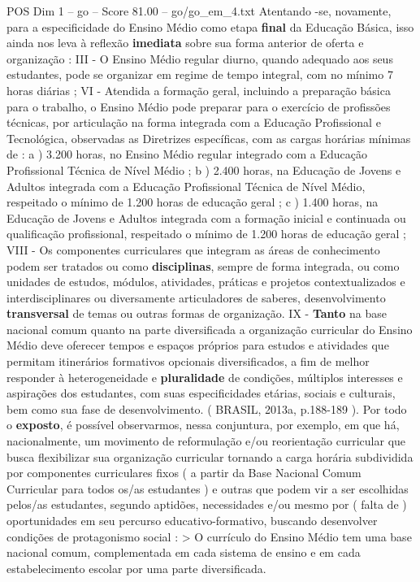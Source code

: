 \begin{textsample}{POS Dim 1 – go – Score 81.00 – go/go\_em\_4.txt}
Atentando -se, novamente, para a especificidade do Ensino Médio como etapa \textbf{final} da Educação Básica, isso ainda nos leva à reflexão \textbf{imediata} sobre sua forma anterior de oferta e organização : III - O Ensino Médio regular diurno, quando adequado aos seus estudantes, pode se organizar em regime de tempo integral, com no mínimo 7 horas diárias ; VI - Atendida a formação geral, incluindo a preparação básica para o trabalho, o Ensino Médio pode preparar para o exercício de profissões técnicas, por articulação na forma integrada com a Educação Profissional e Tecnológica, observadas as Diretrizes específicas, com as cargas horárias mínimas de : a ) 3.200 horas, no Ensino Médio regular integrado com a Educação Profissional Técnica de Nível Médio ; b ) 2.400 horas, na Educação de Jovens e Adultos integrada com a Educação Profissional Técnica de Nível Médio, respeitado o mínimo de 1.200 horas de educação geral ; c ) 1.400 horas, na Educação de Jovens e Adultos integrada com a formação inicial e continuada ou qualificação profissional, respeitado o mínimo de 1.200 horas de educação geral ; VIII - Os componentes curriculares que integram as áreas de conhecimento podem ser tratados ou como \textbf{disciplinas}, sempre de forma integrada, ou como unidades de estudos, módulos, atividades, práticas e projetos contextualizados e interdisciplinares ou diversamente articuladores de saberes, desenvolvimento \textbf{transversal} de temas ou outras formas de organização.
IX - \textbf{Tanto} na base nacional comum quanto na parte diversificada a organização curricular do Ensino Médio deve oferecer tempos e espaços próprios para estudos e atividades que permitam itinerários formativos opcionais diversificados, a fim de melhor responder à heterogeneidade e \textbf{pluralidade} de condições, múltiplos interesses e aspirações dos estudantes, com suas especificidades etárias, sociais e culturais, bem como sua fase de desenvolvimento. ( BRASIL, 2013a, p.188-189 ).
Por todo o \textbf{exposto}, é possível observarmos, nessa conjuntura, por exemplo, em que há, nacionalmente, um movimento de reformulação e/ou reorientação curricular que busca flexibilizar sua organização curricular tornando a carga horária subdividida por componentes curriculares fixos ( a partir da Base Nacional Comum Curricular para todos os/as estudantes ) e outras que podem vir a ser escolhidas pelos/as estudantes, segundo aptidões, necessidades e/ou mesmo por ( falta de ) oportunidades em seu percurso educativo-formativo, buscando desenvolver condições de protagonismo social : > O currículo do Ensino Médio tem uma base nacional comum, complementada em cada sistema de ensino e em cada estabelecimento escolar por uma parte diversificada.

\end{textsample}

